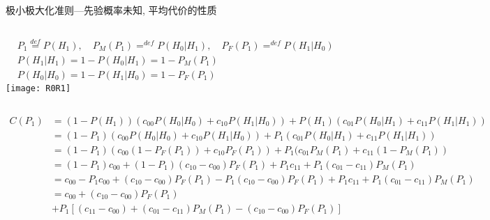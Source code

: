\begin{frame}[shrink]{极小极大化准则---先验概率未知, 平均代价的性质}
\small
\begin{columns}
	\begin{align*}
	&P_1\mathop{=}\limits^{def}P(H_1),\quad P_M(P_1)\mathop{=}^{def}P(H_0|H_1),\quad P_F(P_1)\mathop{=}^{def}P(H_1|H_0)\\
	&P(H_1|H_1)=1-P(H_0|H_1)=1-P_M(P_1)\\
	&P(H_0|H_0)=1-P(H_1|H_0)=1-P_F(P_1)
	\end{align*}
	\texttt{[image: R0R1]}
\end{columns}
\begin{align*}
	C(P_1)&=(1-P(H_1))(c_{00}P(H_0|H_0)+c_{10}P(H_1|H_0))+P(H_1)(c_{01}P(H_0|H_1)+c_{11}P(H_1|H_1))\\
	&=(1-P_1)(c_{00}P(H_0|H_0)+c_{10}P(H_1|H_0))+P_1(c_{01}P(H_0|H_1)+c_{11}P(H_1|H_1))\\
	&=(1-P_1)(c_{00}(1-P_F(P_1))+c_{10}P_F(P_1))+P_1(c_{01}P_M(P_1)+c_{11}(1-P_M(P_1))\\
	&=(1-P_1)c_{00}+(1-P_1)(c_{10}-c_{00})P_F(P_1)+P_1c_{11}+P_1(c_{01}-c_{11})P_M(P_1)\\
	&=c_{00}-P_1c_{00}+(c_{10}-c_{00})P_F(P_1)-P_1(c_{10}-c_{00})P_F(P_1)+P_1c_{11}+P_1(c_{01}-c_{11})P_M(P_1)\\
	&=c_{00}+(c_{10}-c_{00})P_F(P_1)\\
	&+P_1[(c_{11}-c_{00})+(c_{01}-c_{11})P_M(P_1)-(c_{10}-c_{00})P_F(P_1)]
\end{align*}
\end{frame}

